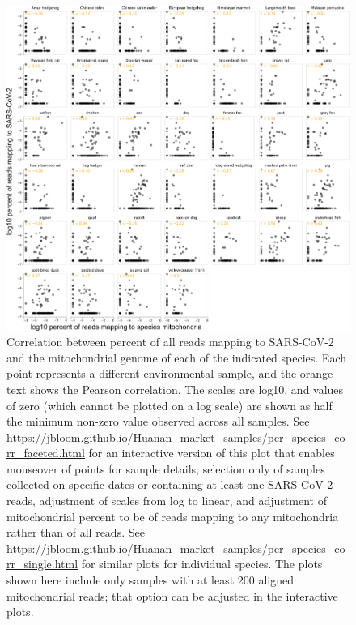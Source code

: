 \documentclass[9pt,twocolumn,twoside]{gsajnl_modified}
\begin{document}
\begin{figure}
\includegraphics[width=\linewidth]{figures/per_species_corr_faceted.png}
\caption{
Correlation between percent of all reads mapping to SARS-CoV-2 and the mitochondrial genome of each of the indicated species.
Each point represents a different environmental sample, and the orange text shows the Pearson correlation.
The scales are log10, and values of zero (which cannot be plotted on a log scale) are shown as half the minimum non-zero value observed across all samples.
See \url{https://jbloom.github.io/Huanan_market_samples/per_species_corr_faceted.html} for an interactive version of this plot that enables mouseover of points for sample details, selection only of samples collected on specific dates or containing at least one SARS-CoV-2 reads, adjustment of scales from log to linear, and adjustment of mitochondrial percent to be of reads mapping to any mitochondria rather than of all reads.
See \url{https://jbloom.github.io/Huanan_market_samples/per_species_corr_single.html} for similar plots for individual species.
The plots shown here include only samples with at least 200 aligned mitochondrial reads; that option can be adjusted in the interactive plots.
\label{fig:per_species_corr_faceted}
}
\end{figure}
\end{document}
